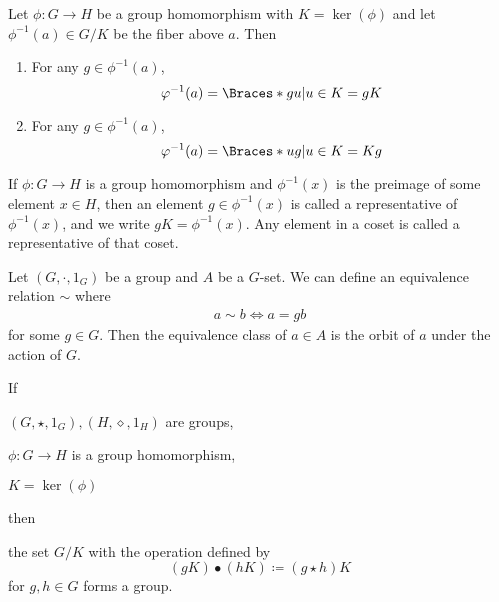 \documentclass[a5paper]{article}
\begin{document}
\begin{theorem}
	Let $\phi:G\to H$ be a group homomorphism with $K=\operatorname{ker}(\phi)$
  and let $\phi^{-1}(a)\in G/K$ be the fiber above $a$. Then
  \begin{enumerate}%
    \item For any $g\in \phi^{-1}(a)$,
      \begin{equation*}
        \phi^{-1}(a)=\braces{gu|u\in K}=gK
      \end{equation*}
    \item For any $g\in \phi^{-1}(a)$,
      \begin{equation*}
        \phi^{-1}(a)=\braces{ug|u\in K}=Kg
      \end{equation*}
  \end{enumerate}
\end{theorem}

\begin{definition}
  If $\phi:G\to H$ is a group homomorphism and $\phi^{-1}(x)$ is the preimage of
  some element $x\in H$, then an element $g\in \phi^{-1}(x)$ is called a
  representative of $\phi^{-1}(x)$, and we write $gK=\phi^{-1}(x)$. Any element in
  a coset is called a representative of that coset.
\end{definition}

\begin{definition}[Orbit]
  Let $(G,\cdot,1_G)$ be a group and $A$ be a $G$-set. We can define an
  equivalence relation $\sim$ where
  \begin{align*}
    a\sim b\iff a=gb
  \end{align*}
  for some $g\in G$. Then the equivalence class of $a\in A$ is the orbit of $a$
  under the action of $G$.
\end{definition}

\begin{theorem}
  If
  \begin{premises}
    \item $(G,\star,1_G),(H,\diamond,1_H)$ are groups,
    \item $\phi:G\to H$ is a group homomorphism,
    \item $K=\operatorname{ker}(\phi)$
  \end{premises}
  then
  \begin{conclusion}
    the set $G/K$ with the operation defined by
    \begin{equation*}
      (gK)\bullet (hK)\coloneqq (g\star h)K
    \end{equation*}
    for $g,h\in G$ forms a group.
  \end{conclusion}
\end{theorem}
\end{document}
